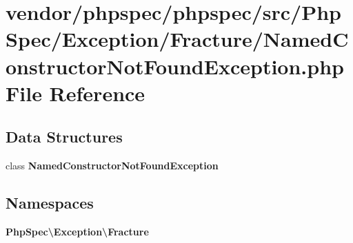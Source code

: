 \section{vendor/phpspec/phpspec/src/\+Php\+Spec/\+Exception/\+Fracture/\+Named\+Constructor\+Not\+Found\+Exception.php File Reference}
\label{_named_constructor_not_found_exception_8php}
\subsection*{Data Structures}
\begin{DoxyCompactItemize}
\item 
class {\bf Named\+Constructor\+Not\+Found\+Exception}
\end{DoxyCompactItemize}
\subsection*{Namespaces}
\begin{DoxyCompactItemize}
\item 
 {\bf Php\+Spec\textbackslash{}\+Exception\textbackslash{}\+Fracture}
\end{DoxyCompactItemize}
